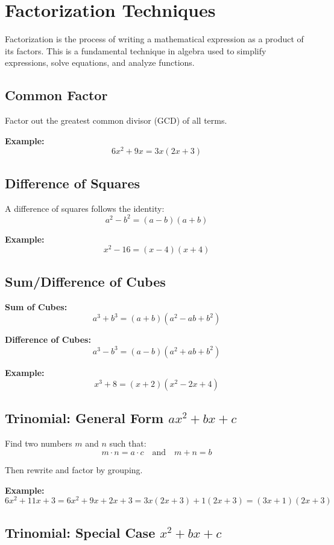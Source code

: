 \section{Factorization Techniques}

Factorization is the process of writing a mathematical expression as a product of its factors. This is a fundamental technique in algebra used to simplify expressions, solve equations, and analyze functions.

\subsection{Common Factor}

Factor out the greatest common divisor (GCD) of all terms.

\textbf{Example:}
\[
6x^2 + 9x = 3x(2x + 3)
\]

\subsection{Difference of Squares}

A difference of squares follows the identity:
\[
a^2 - b^2 = (a - b)(a + b)
\]

\textbf{Example:}
\[
x^2 - 16 = (x - 4)(x + 4)
\]

\subsection{Sum/Difference of Cubes}

\textbf{Sum of Cubes:}
\[
a^3 + b^3 = (a + b)(a^2 - ab + b^2)
\]

\textbf{Difference of Cubes:}
\[
a^3 - b^3 = (a - b)(a^2 + ab + b^2)
\]

\textbf{Example:}
\[
x^3 + 8 = (x + 2)(x^2 - 2x + 4)
\]

\subsection{Trinomial: General Form \texorpdfstring{$ax^2 + bx + c$}{ax² + bx + c}}

Find two numbers $m$ and $n$ such that:
\[
m \cdot n = a \cdot c \quad \text{and} \quad m + n = b
\]

Then rewrite and factor by grouping.

\textbf{Example:}
\[
6x^2 + 11x + 3 = 6x^2 + 9x + 2x + 3 = 3x(2x + 3) + 1(2x + 3) = (3x + 1)(2x + 3)
\]

\subsection{Trinomial: Special Case \texorpdfstring{$x^2 + bx + c$}{x² + bx + c}}

